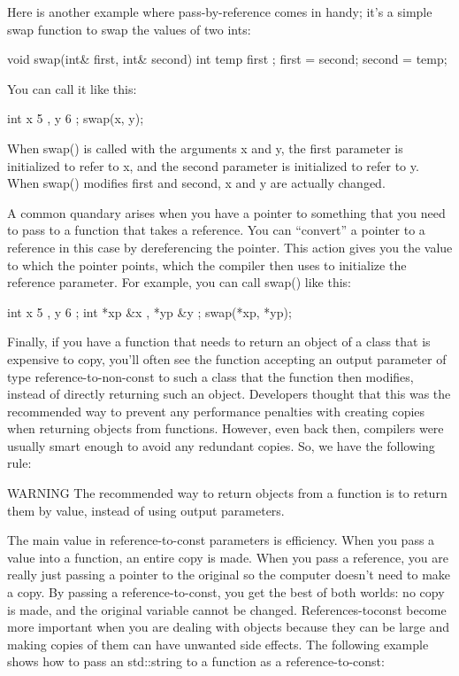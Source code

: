 Here is another example where pass-by-reference comes in handy; it’s a simple swap function to swap the values of two ints:

\begin{cpp}
void swap(int& first, int& second)
{
    int temp { first };
    first = second;
    second = temp;
}
\end{cpp}

You can call it like this:

\begin{cpp}
int x { 5 }, y { 6 };
swap(x, y);
\end{cpp}

When swap() is called with the arguments x and y, the first parameter is initialized to refer to x, and the second parameter is initialized to refer to y. When swap() modifies first and second, x and y are actually changed.

A common quandary arises when you have a pointer to something that you need to pass to a function that takes a reference. You can “convert” a pointer to a reference in this case by dereferencing the pointer. This action gives you the value to which the pointer points, which the compiler then uses to initialize the reference parameter. For example, you can call swap() like this:

\begin{cpp}
int x { 5 }, y { 6 };
int *xp { &x }, *yp { &y };
swap(*xp, *yp);
\end{cpp}

Finally, if you have a function that needs to return an object of a class that is expensive to copy, you’ll often see the function accepting an output parameter of type reference-to-non-const to such a class that the function then modifies, instead of directly returning such an object. Developers thought that this was the recommended way to prevent any performance penalties with creating copies when returning objects from functions. However, even back then, compilers were usually smart enough to avoid any redundant copies. So, we have the following rule:

\begin{myWarning}{WARNING}
The recommended way to return objects from a function is to return them by value, instead of using output parameters.
\end{myWarning}


The main value in reference-to-const parameters is efficiency. When you pass a value into a function, an entire copy is made. When you pass a reference, you are really just passing a pointer to the original so the computer doesn’t need to make a copy. By passing a reference-to-const, you get the best of both worlds: no copy is made, and the original variable cannot be changed. References-toconst become more important when you are dealing with objects because they can be large and making copies of them can have unwanted side effects. The following example shows how to pass an std::string to a function as a reference-to-const:

